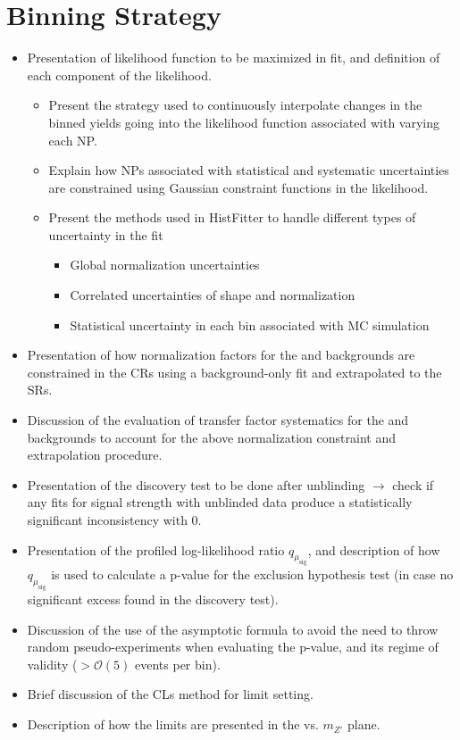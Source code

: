 \section{Binning Strategy}
\label{sec:binning_strategy}


\begin{itemize}
\item Presentation of likelihood function to be maximized in fit, and definition of each component of the likelihood.
\begin{itemize}
\item Present the strategy used to continuously interpolate changes in the binned yields going into the likelihood function associated with varying each NP.
\item Explain how NPs associated with statistical and systematic uncertainties are constrained using Gaussian constraint functions in the likelihood.
\item Present the methods used in HistFitter to handle different types of uncertainty in the fit
\begin{itemize}
\item Global normalization uncertainties
\item Correlated uncertainties of shape and normalization
\item Statistical uncertainty in each bin associated with MC simulation
\end{itemize}
\end{itemize}
\item Presentation of how normalization factors for the \wjets and \ttbar backgrounds are constrained in the CRs using a background-only fit and extrapolated to the SRs. 
\item Discussion of the evaluation of transfer factor systematics for the \wjets and \ttbar backgrounds to account for the above normalization constraint and extrapolation procedure.
\item Presentation of the discovery test to be done after unblinding $\rightarrow$ check if any fits for signal strength with unblinded data produce a statistically significant inconsistency with 0.
\item Presentation of the profiled log-likelihood ratio $q_{\mu_\text{sig}}$, and description of how $q_{\mu_\text{sig}}$ is used to calculate a p-value for the exclusion hypothesis test (in case no significant excess found in the discovery test).
\item Discussion of the use of the asymptotic formula to avoid the need to throw random pseudo-experiments when evaluating the p-value, and its regime of validity ($>\mathcal{O}(5)$ events per bin).
\item Brief discussion of the CLs method for limit setting.
\item Description of how the limits are presented in the \ms vs. $m_{Z'}$ plane.
\end{itemize}
